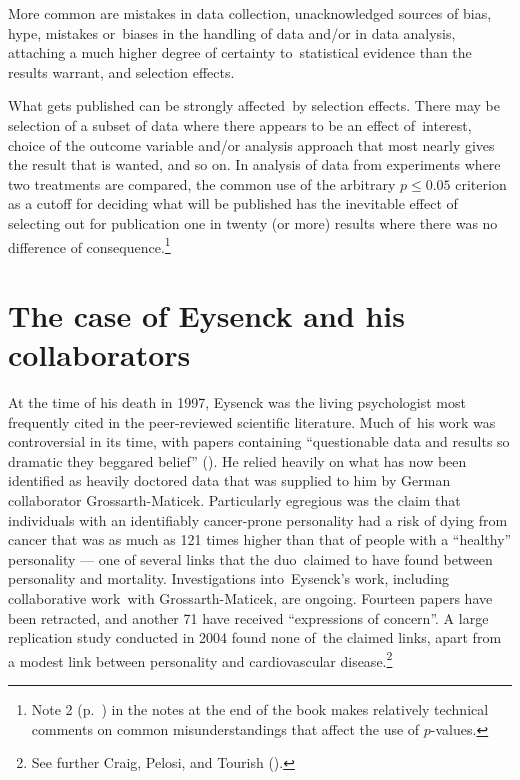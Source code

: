 \documentclass[
  10ptls,
  b5paper]{book}
\begin{document}
More common are mistakes in data collection, unacknowledged
sources of bias, hype, mistakes or~biases in the handling of
data and/or in data analysis, attaching a much higher
degree of certainty to~statistical evidence than the results
warrant, and selection effects.

What gets published can be strongly affected~by selection
effects. There may be selection of a subset of data where
there appears to be an effect of~interest, choice of the
outcome variable and/or analysis approach that most nearly
gives the result that is wanted, and so on. In analysis of
data from experiments where two treatments are compared,
the common use of the arbitrary \(p \leq 0.05\)
criterion as a cutoff for deciding what will be published
has the inevitable effect of selecting out for publication
one in twenty (or more) results where there was no difference
of consequence.\footnote{Note 2 (p.~\pageref{pval}) in the notes at the end of the book makes relatively technical comments on common misunderstandings that affect the use of \(p\)-values.}

\section{The case of Eysenck and his collaborators}\label{the-case-of-eysenck-and-his-collaborators}

At the time of his death in 1997, Eysenck was the living psychologist
most frequently cited in the peer-reviewed scientific literature.
Much of~his work was controversial in its time, with papers
containing ``questionable data and results so dramatic they beggared
belief'' (). He relied heavily on what has now been
identified as heavily doctored data that was supplied to him by
German collaborator Grossarth-Maticek. Particularly egregious was
the claim that individuals with an identifiably cancer-prone personality
had a risk of dying from cancer that was as much as 121 times higher
than that of people with a ``healthy'' personality --- one of several
links that the duo~claimed to have found between personality and
mortality. Investigations into~Eysenck's work, including
collaborative work~with Grossarth-Maticek, are ongoing. Fourteen
papers have been retracted, and another 71 have received
``expressions of concern''. A large replication study conducted in
2004 found none of~the claimed links, apart from a modest link between
personality and cardiovascular disease.\footnote{See further Craig, Pelosi, and Tourish ().}
\end{document}
